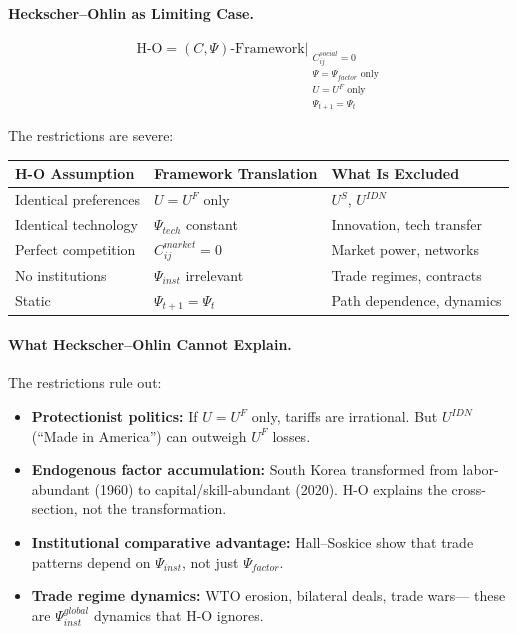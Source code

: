 \paragraph{Heckscher--Ohlin as Limiting Case.}
\begin{equation}
  \text{H-O} = (C, \Psi)\text{-Framework} \Big|_{\substack{
    C_{ij}^{social} = 0 \\
    \Psi = \Psi_{factor} \text{ only} \\
    U = U^F \text{ only} \\
    \Psi_{t+1} = \Psi_t
  }}
\end{equation}

The restrictions are severe:
\begin{center}
\renewcommand{\arraystretch}{1.2}
\begin{tabular}{lll}
\hline
\textbf{H-O Assumption} & \textbf{Framework Translation} & \textbf{What Is Excluded} \\
\hline
Identical preferences & $U = U^F$ only & $U^S$, $U^{IDN}$ \\
Identical technology & $\Psi_{tech}$ constant & Innovation, tech transfer \\
Perfect competition & $C_{ij}^{market} = 0$ & Market power, networks \\
No institutions & $\Psi_{inst}$ irrelevant & Trade regimes, contracts \\
Static & $\Psi_{t+1} = \Psi_t$ & Path dependence, dynamics \\
\hline
\end{tabular}
\end{center}

\paragraph{What Heckscher--Ohlin Cannot Explain.}
The restrictions rule out:
\begin{itemize}
  \item \textbf{Protectionist politics:} If $U = U^F$ only, tariffs are irrational.
        But $U^{IDN}$ (``Made in America'') can outweigh $U^F$ losses.
  \item \textbf{Endogenous factor accumulation:} South Korea transformed from
        labor-abundant (1960) to capital/skill-abundant (2020).
        H-O explains the cross-section, not the transformation.
  \item \textbf{Institutional comparative advantage:} Hall--Soskice show that
        trade patterns depend on $\Psi_{inst}$, not just $\Psi_{factor}$.
  \item \textbf{Trade regime dynamics:} WTO erosion, bilateral deals, trade wars---
        these are $\Psi_{inst}^{global}$ dynamics that H-O ignores.
\end{itemize}

